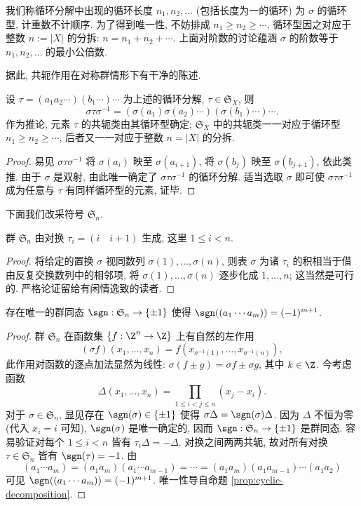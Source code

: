 我们称循环分解中出现的循环长度 $n_1, n_2, \ldots$ (包括长度为一的循环) 为 $\sigma$ 的循环型, 计重数不计顺序. 为了得到唯一性, 不妨排成 $n_1 \geq n_2 \geq \cdots$, 循环型因之对应于整数 $n := |X|$ 的分拆: $n = n_1 + n_2 + \cdots$. 上面对阶数的讨论蕴涵 $\sigma$ 的阶数等于 $n_1, n_2, \ldots$ 的最小公倍数. 

据此, 共轭作用在对称群情形下有干净的陈述.
\begin{lemma}\label{prop:cycle-type}
	设 $\tau = (a_1 a_2 \cdots) (b_1 \cdots) \cdots$ 为上述的循环分解, $\tau \in \mathfrak{S}_X$, 则
	\[ \sigma \tau \sigma^{-1} = (\sigma(a_1) \sigma(a_2) \cdots) (\sigma(b_1) \cdots) \cdots. \]
	作为推论, 元素 $\tau$ 的共轭类由其循环型确定; $\mathfrak{S}_X$ 中的共轭类一一对应于循环型 $n_1 \geq n_2 \geq \cdots$, 后者又一一对应于整数 $n = |X|$ 的分拆.
\end{lemma}
\begin{proof}
	易见 $\sigma \tau \sigma^{-1}$ 将 $\sigma(a_i)$ 映至 $\sigma(a_{i+1})$, 将 $\sigma(b_j)$ 映至 $\sigma(b_{j+1})$, 依此类推. 由于 $\sigma$ 是双射, 由此唯一确定了 $\sigma \tau \sigma^{-1}$ 的循环分解. 适当选取 $\sigma$ 即可使 $\sigma\tau\sigma^{-1}$ 成为任意与 $\tau$ 有同样循环型的元素, 证毕. 
\end{proof}

下面我们改采符号 $\mathfrak{S}_n$.
\begin{lemma}\label{prop:S_n-generation}
	群 $\mathfrak{S}_n$ 由对换 $\tau_i = (i \quad i+1)$ 生成, 这里 $1 \leq i < n$.
\end{lemma}
\begin{proof}
	将给定的置换 $\sigma$ 视同数列 $\sigma(1), \ldots, \sigma(n)$, 则表 $\sigma$ 为诸 $\tau_i$ 的积相当于借由反复交换数列中的相邻项, 将 $\sigma(1), \ldots, \sigma(n)$ 逐步化成 $1, \ldots, n$; 这当然是可行的. 严格论证留给有闲情逸致的读者.
\end{proof}

\begin{lemma}
	存在唯一的群同态 $\sgn: \mathfrak{S}_n \to \{\pm 1\}$ 使得 $\sgn((a_1 \cdots a_m)) = (-1)^{m+1}$.
\end{lemma}
\begin{proof}
	群 $\mathfrak{S}_n$ 在函数集 $\{ f: \Z^n \to \Z\}$ 上有自然的左作用
	\[ (\sigma f)(x_1, \ldots, x_n) = f(x_{\sigma^{-1}(1)}, \ldots, x_{\sigma^{-1}(n)}), \]
	此作用对函数的逐点加法显然为线性: $\sigma(f \pm g) = \sigma f \pm \sigma g$, 其中 $k \in \Z$. 今考虑函数
	\[ \Delta(x_1, \ldots, x_n) = \prod_{1 \leq i < j \leq n} (x_j - x_i). \]
	对于 $\sigma \in \mathfrak{S}_n$, 显见存在 $\sgn(\sigma) \in \{\pm 1\}$ 使得 $\sigma \Delta = \sgn(\sigma)\Delta$. 因为 $\Delta$ 不恒为零 (代入 $x_i = i$ 可知), $\sgn(\sigma)$ 是唯一确定的, 因而 $\sgn: \mathfrak{S}_n \to \{\pm1 \}$ 是群同态. 容易验证对每个 $1 \leq i < n$ 皆有 $\tau_i \Delta = -\Delta$. 对换之间两两共轭, 故对所有对换 $\tau \in \mathfrak{S}_n$ 皆有 $\sgn(\tau)=-1$. 由
	\[(a_1 \cdots a_m) = (a_1 a_m) (a_1 \cdots a_{m-1}) = \cdots = (a_1 a_m) (a_1 a_{m-1}) \cdots (a_1 a_2) \]
	可见 $\sgn((a_1 \cdots a_m)) = (-1)^{m+1}$. 唯一性导自命题 \ref{prop:cyclic-decomposition}. 
\end{proof}

